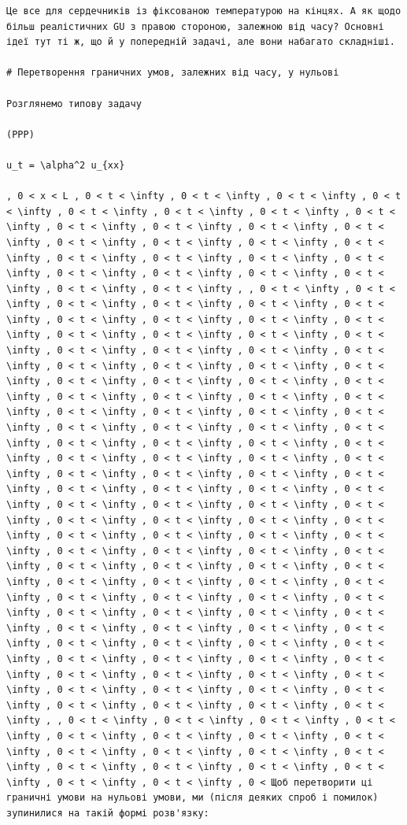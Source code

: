\documentclass[
  ukrainian,
]{article}
\begin{document}
\begin{verbatim}
Це все для сердечників із фіксованою температурою на кінцях. А як щодо більш реалістичних GU з правою стороною, залежною від часу? Основні ідеї тут ті ж, що й у попередній задачі, але вони набагато складніші.

# Перетворення граничних умов, залежних від часу, у нульові

Розглянемо типову задачу

(PPP)

u_t = \alpha^2 u_{xx}

, 0 < x < L , 0 < t < \infty , 0 < t < \infty , 0 < t < \infty , 0 < t < \infty , 0 < t < \infty , 0 < t < \infty , 0 < t < \infty , 0 < t < \infty , 0 < t < \infty , 0 < t < \infty , 0 < t < \infty , 0 < t < \infty , 0 < t < \infty , 0 < t < \infty , 0 < t < \infty , 0 < t < \infty , 0 < t < \infty , 0 < t < \infty , 0 < t < \infty , 0 < t < \infty , 0 < t < \infty , 0 < t < \infty , 0 < t < \infty , 0 < t < \infty , 0 < t < \infty , 0 < t < \infty , , 0 < t < \infty , 0 < t < \infty , 0 < t < \infty , 0 < t < \infty , 0 < t < \infty , 0 < t < \infty , 0 < t < \infty , 0 < t < \infty , 0 < t < \infty , 0 < t < \infty , 0 < t < \infty , 0 < t < \infty , 0 < t < \infty , 0 < t < \infty , 0 < t < \infty , 0 < t < \infty , 0 < t < \infty , 0 < t < \infty , 0 < t < \infty , 0 < t < \infty , 0 < t < \infty , 0 < t < \infty , 0 < t < \infty , 0 < t < \infty , 0 < t < \infty , 0 < t < \infty , 0 < t < \infty , 0 < t < \infty , 0 < t < \infty , 0 < t < \infty , 0 < t < \infty , 0 < t < \infty , 0 < t < \infty , 0 < t < \infty , 0 < t < \infty , 0 < t < \infty , 0 < t < \infty , 0 < t < \infty , 0 < t < \infty , 0 < t < \infty , 0 < t < \infty , 0 < t < \infty , 0 < t < \infty , 0 < t < \infty , 0 < t < \infty , 0 < t < \infty , 0 < t < \infty , 0 < t < \infty , 0 < t < \infty , 0 < t < \infty , 0 < t < \infty , 0 < t < \infty , 0 < t < \infty , 0 < t < \infty , 0 < t < \infty , 0 < t < \infty , 0 < t < \infty , 0 < t < \infty , 0 < t < \infty , 0 < t < \infty , 0 < t < \infty , 0 < t < \infty , 0 < t < \infty , 0 < t < \infty , 0 < t < \infty , 0 < t < \infty , 0 < t < \infty , 0 < t < \infty , 0 < t < \infty , 0 < t < \infty , 0 < t < \infty , 0 < t < \infty , 0 < t < \infty , 0 < t < \infty , 0 < t < \infty , 0 < t < \infty , 0 < t < \infty , 0 < t < \infty , 0 < t < \infty , 0 < t < \infty , 0 < t < \infty , 0 < t < \infty , 0 < t < \infty , 0 < t < \infty , 0 < t < \infty , 0 < t < \infty , 0 < t < \infty , 0 < t < \infty , 0 < t < \infty , 0 < t < \infty , 0 < t < \infty , 0 < t < \infty , 0 < t < \infty , 0 < t < \infty , 0 < t < \infty , 0 < t < \infty , 0 < t < \infty , 0 < t < \infty , 0 < t < \infty , 0 < t < \infty , 0 < t < \infty , 0 < t < \infty , 0 < t < \infty , 0 < t < \infty , 0 < t < \infty , 0 < t < \infty , 0 < t < \infty , 0 < t < \infty , 0 < t < \infty , 0 < t < \infty , , 0 < t < \infty , 0 < t < \infty , 0 < t < \infty , 0 < t < \infty , 0 < t < \infty , 0 < t < \infty , 0 < t < \infty , 0 < t < \infty , 0 < t < \infty , 0 < t < \infty , 0 < t < \infty , 0 < t < \infty , 0 < t < \infty , 0 < t < \infty , 0 < t < \infty , 0 < t < \infty , 0 < t < \infty , 0 < t < \infty , 0 < Щоб перетворити ці граничні умови на нульові умови, ми (після деяких спроб і помилок) зупинилися на такій формі розв'язку:


\end{verbatim}
\end{document}
